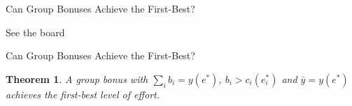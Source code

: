 \documentclass[aspectratio=169,usenames,dvipsnames]{beamer}
\newenvironment{wideitemize}{\itemize\addtolength{\itemsep}{10pt}}{\enditemize}
\newtheorem*{theorem*}{Theorem}
\begin{document}
\begin{frame}{Can Group Bonuses Achieve the First-Best?}

\Huge See the board
    
\end{frame}

\begin{frame}{Can Group Bonuses Achieve the First-Best?}
\begin{theorem*}
    A group bonus with $\sum_i b_i=y(e^*)$, $b_i>c_i(e_i^*)$ and $\bar y = y(e^*)$ achieves the first-best level of effort.
\end{theorem*}
    
\end{frame}



    
    
\end{document}
